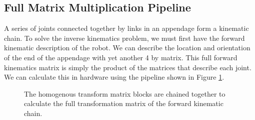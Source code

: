 \subsection{Full Matrix Multiplication Pipeline}

A series of joints connected together by links in an appendage form a kinematic chain. To solve the inverse kinematics problem, we must first have the forward kinematic description of the robot. We can describe the location and orientation of the end of the appendage with yet another 4 by matrix. This full forward kinematics matrix is simply the product of the matrices that describe each joint. We can calculate this in hardware using the pipeline shown in Figure \ref{fig:dh_transform_pipeline}.

\begin{figure}[ht]
\center
{}
\caption{The homogenous transform matrix blocks are chained together to calculate the full transformation matrix of the forward kinematic chain.}
\label{fig:dh_transform_pipeline}
\end{figure}
